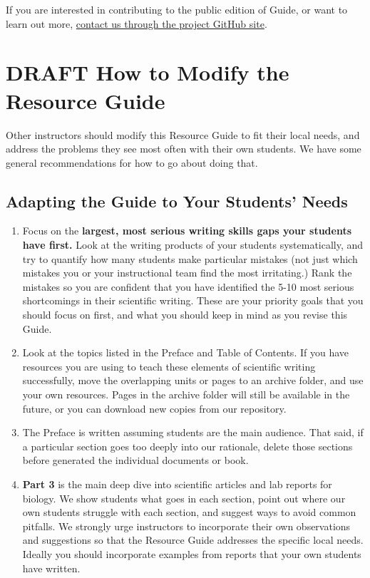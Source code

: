 \documentclass[
]{book}
\begin{document}
If you are interested in contributing to the public edition of Guide, or want to learn out more, \href{https://github.com/adanieljohnson/stemwritingproject/wiki}{contact us through the project GitHub site}.

\hypertarget{draft-how-to-modify-the-resource-guide}{%
\chapter*{DRAFT How to Modify the Resource Guide}\label{draft-how-to-modify-the-resource-guide}}

Other instructors should modify this Resource Guide to fit their local needs, and address the problems they see most often with their own students. We have some general recommendations for how to go about doing that.

\hypertarget{adapting-the-guide-to-your-students-needs}{%
\section*{Adapting the Guide to Your Students' Needs}\label{adapting-the-guide-to-your-students-needs}}

\begin{enumerate}
\def\labelenumi{\arabic{enumi}.}
\item
  Focus on the \textbf{largest, most serious writing skills gaps your students have first.} Look at the writing products of your students systematically, and try to quantify how many students make particular mistakes (not just which mistakes you or your instructional team find the most irritating.) Rank the mistakes so you are confident that you have identified the 5-10 most serious shortcomings in their scientific writing. These are your priority goals that you should focus on first, and what you should keep in mind as you revise this Guide.
\item
  Look at the topics listed in the Preface and Table of Contents. If you have resources you are using to teach these elements of scientific writing successfully, move the overlapping units or pages to an archive folder, and use your own resources. Pages in the archive folder will still be available in the future, or you can download new copies from our repository.
\item
  The Preface is written assuming students are the main audience. That said, if a particular section goes too deeply into our rationale, delete those sections before generated the individual documents or book.
\item
  \textbf{Part 3} is the main deep dive into scientific articles and lab reports for biology. We show students what goes in each section, point out where our own students struggle with each section, and suggest ways to avoid common pitfalls. We strongly urge instructors to incorporate their own observations and suggestions so that the Resource Guide addresses the specific local needs. Ideally you should incorporate examples from reports that your own students have written.
\end{enumerate}
\end{document}
